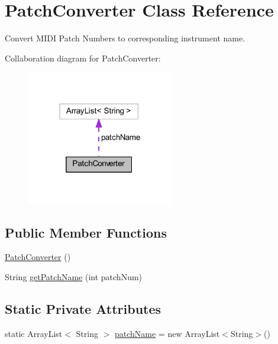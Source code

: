 \hypertarget{classcom_1_1lclion_1_1midiparser_1_1_patch_converter}{\section{Patch\+Converter Class Reference}
\label{classcom_1_1lclion_1_1midiparser_1_1_patch_converter}
}


Convert M\+I\+D\+I Patch Numbers to corresponding instrument name.  




Collaboration diagram for Patch\+Converter\+:\nopagebreak
\begin{figure}[H]
\begin{center}
\leavevmode
\includegraphics[width=183pt]{classcom_1_1lclion_1_1midiparser_1_1_patch_converter__coll__graph}
\end{center}
\end{figure}
\subsection*{Public Member Functions}
\begin{DoxyCompactItemize}
\item 
\hyperlink{classcom_1_1lclion_1_1midiparser_1_1_patch_converter_a3fa7bf625d76c88c6703326ceb1402e5}{Patch\+Converter} ()
\item 
String \hyperlink{classcom_1_1lclion_1_1midiparser_1_1_patch_converter_a6b0d3c53592bd1ab882a7ff96c1f368e}{get\+Patch\+Name} (int patch\+Num)
\end{DoxyCompactItemize}
\subsection*{Static Private Attributes}
\begin{DoxyCompactItemize}
\item 
static Array\+List$<$ String $>$ \hyperlink{classcom_1_1lclion_1_1midiparser_1_1_patch_converter_a62653567f7df39fd70881a4e4c6b6047}{patch\+Name} = new Array\+List$<$String$>$()
\end{DoxyCompactItemize}


